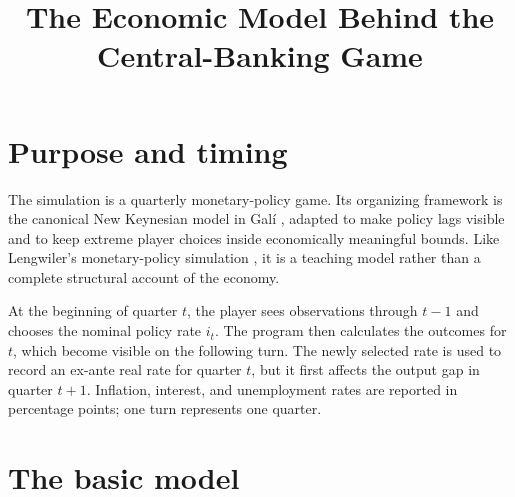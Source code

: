 \documentclass[11pt]{article}
\title{The Economic Model Behind the Central-Banking Game}
\author{}
\date{}
\begin{document}
\maketitle

\section{Purpose and timing}

The simulation is a quarterly monetary-policy game.  Its organizing framework
is the canonical New Keynesian model in Gal\'i \cite{gali2015}, adapted to make
policy lags visible and to keep extreme player choices inside economically
meaningful bounds.  Like Lengwiler's monetary-policy simulation
\cite{lengwiler2004}, it is a teaching model rather than a complete structural
account of the economy.

At the beginning of quarter $t$, the player sees observations through $t-1$ and
chooses the nominal policy rate $i_t$.  The program then calculates the outcomes
for $t$, which become visible on the following turn.  The newly selected rate is
used to record an ex-ante real rate for quarter $t$, but it first affects the
output gap in quarter $t+1$.  Inflation, interest, and unemployment rates are
reported in percentage points; one turn represents one quarter.

\section{The basic model}
\end{document}
